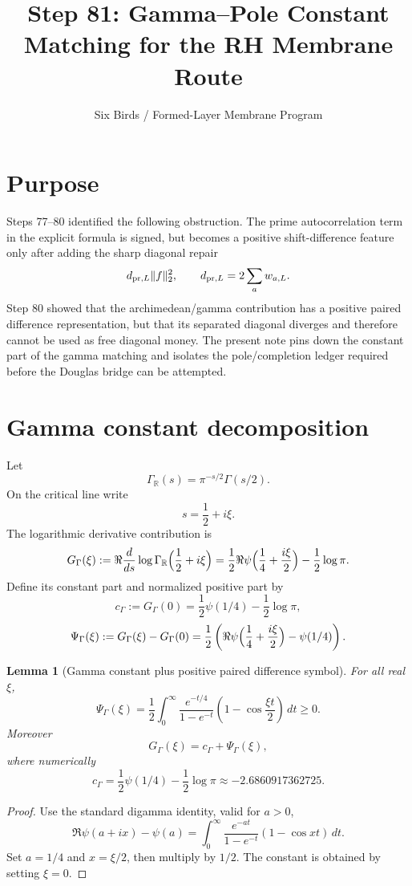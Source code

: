 \documentclass[11pt]{article}
\title{Step 81: Gamma--Pole Constant Matching for the RH Membrane Route}
\author{Six Birds / Formed-Layer Membrane Program}
\date{}
\newtheorem{lemma}{Lemma}
\begin{document}
\maketitle

\section{Purpose}
Steps 77--80 identified the following obstruction.  The prime autocorrelation term in the explicit formula is signed, but becomes a positive shift-difference feature only after adding the sharp diagonal repair
\[
  d_{{\rm pr},L}\|f\|_2^2,
  \qquad
  d_{{\rm pr},L}=2\sum_a w_{a,L}.
\]
Step 80 showed that the archimedean/gamma contribution has a positive paired difference representation, but that its separated diagonal diverges and therefore cannot be used as free diagonal money.  The present note pins down the constant part of the gamma matching and isolates the pole/completion ledger required before the Douglas bridge can be attempted.

\section{Gamma constant decomposition}
Let
\[
  \Gamma_{\mathbb R}(s)=\pi^{-s/2}\Gamma(s/2).
\]
On the critical line write
\[
  s=\frac12+i\xi.
\]
The logarithmic derivative contribution is
\[
  G_\Gamma(\xi)
  :=\Re\frac{d}{ds}\log\Gamma_{\mathbb R}\Bigl(\frac12+i\xi\Bigr)
  =\frac12\Re\psi\Bigl(\frac14+\frac{i\xi}{2}\Bigr)-\frac12\log\pi.
\]
Define its constant part and normalized positive part by
\[
  c_\Gamma:=G_\Gamma(0)=\frac12\psi(1/4)-\frac12\log\pi,
\]
\[
  \Psi_\Gamma(\xi):=G_\Gamma(\xi)-G_\Gamma(0)
  =\frac12\left(\Re\psi\Bigl(\frac14+\frac{i\xi}{2}\Bigr)-\psi(1/4)\right).
\]

\begin{lemma}[Gamma constant plus positive paired difference symbol]
For all real \(\xi\),
\[
  \Psi_\Gamma(\xi)
  =\frac12\int_0^\infty \frac{e^{-t/4}}{1-e^{-t}}
  \left(1-\cos\frac{\xi t}{2}\right)\,dt\ge 0.
\]
Moreover
\[
  G_\Gamma(\xi)=c_\Gamma+\Psi_\Gamma(\xi),
\]
where numerically
\[
  c_\Gamma=\frac12\psi(1/4)-\frac12\log\pi\approx -2.6860917362725.
\]
\end{lemma}

\begin{proof}
Use the standard digamma identity, valid for \(a>0\),
\[
  \Re\psi(a+ix)-\psi(a)=\int_0^\infty \frac{e^{-at}}{1-e^{-t}}(1-\cos xt)\,dt.
\]
Set \(a=1/4\) and \(x=\xi/2\), then multiply by \(1/2\). The constant is obtained by setting \(\xi=0\).
\end{proof}
\end{document}
